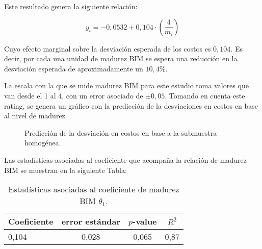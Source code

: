 Este resultado genera la siguiente relación:

\begin{equation}
    \label{eq.modelo-prop-submuestra}
    y_i = -0,0532 + 0,104\cdot \left( \frac{4}{m_i} \right)
\end{equation}

Cuyo efecto marginal sobre la desviación esperada de los costos es $0,104$. Es decir, por cada una unidad de madurez BIM se espera una reducción en la desviación esperada de aproximadamente un $10,4\%$.

La escala con la que se mide madurez BIM para este estudio toma valores que van desde el 1 al 4, con un error asociado de $\pm 0,05$. Tomando en cuenta este rating, se genera un gráfico con la predicción de la desviaciones en costos en base al nivel de madurez.

\begin{figure}[H]
    \centering
    \caption{Predicción de la desviación en costos en base a la submuestra homogénea.}
\end{figure}

Las estadísticas asociadas al coeficiente que acompaña la relación de madurez BIM se muestran en la siguiente Tabla:

\begin{table}[H]
    \centering
    \label{tab.est}
    \caption{Estadísticas asociadas al coeficiente de madurez BIM $\theta_1$.}
    \begin{tabular}{lccc}
        \toprule
        Coeficiente & error estándar & $p$-value & $R^2$\\
        \midrule
        0,104 & 0,028 & 0,065 & 0,87\\  
        \bottomrule        
    \end{tabular}
\end{table}

